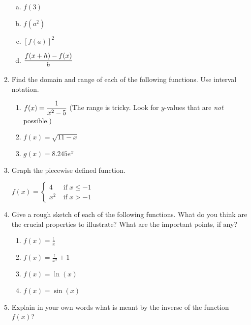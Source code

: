 \documentclass[11pt,fleqn]{article}
\begin{document}
\begin{enumerate}
      \begin{enumerate}[(a)]
      \item $f(3)$
\vskip1in
      \item $f(a^2)$
\vskip1in
      \item $[f(a)]^2$
     \vskip1in
      \item $\displaystyle \frac{f(x+h) - f(x)}{h}$
      \end{enumerate}

\newpage

\item Find the domain and range of each of the following functions. Use interval notation.
\begin{enumerate}
\item $f(x) = \displaystyle \frac{1}{x^2 - 5}$ (The range is tricky. Look for $y$-values that are \emph{not} possible.)
\vfill
      \item  $f(x) = \sqrt{11 - x}$ 
      \vfill
       \item $g(x) = 8.245e^x$
       \vfill
\end{enumerate}

\item Graph the piecewise defined function.

        $f(x) =
        \begin{cases}
          4 \; &\text{if} \; x \le - 1 \\
          x^2 \; &\text{if} \; x > -1
        \end{cases}$
        \vspace{1.5in}
\newpage

\item Give a rough sketch of each of the following functions. What do you think are the crucial properties to illustrate? What are the important points, if any?
\begin{enumerate} 
\item $f(x)=\frac{1}{x}$
\vfill
\item $f(x)=\frac{1}{x^2}+1$
\vfill
\item $f(x)=\ln (x)$
\vfill
\item $f(x)=\sin (x)$
\vfill
\end{enumerate}
\item Explain in your own words what is meant by the inverse of the function $f(x)$?
\vfill
\end{enumerate}
\end{document}

